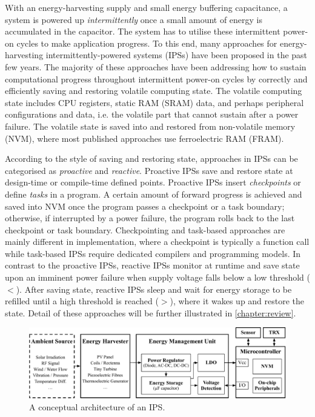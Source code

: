 
\needref
With an energy-harvesting supply and small energy buffering capacitance, a system is powered up \textit{intermittently} once a small amount of energy is accumulated in the capacitor. 
The system has to utilise these intermittent power-on cycles to make application progress. 
To this end, many approaches for energy-harvesting intermittently-powered systems (IPSs) have been proposed in the past few years. 
The majority of these approaches have been addressing how to sustain computational progress throughout intermittent power-on cycles by correctly and efficiently saving and restoring volatile computing state. 
The volatile computing state includes CPU registers, static RAM (SRAM) data, and perhaps peripheral configurations and data, i.e. the volatile part that cannot sustain after a power failure. 
The volatile state is saved into and restored from non-volatile memory (NVM), where most published approaches use ferroelectric RAM (FRAM). 

\needref
According to the style of saving and restoring state, approaches in IPSs can be categorised as \textit{proactive} and \textit{reactive}. 
Proactive IPSs save and restore state at design-time or compile-time defined points. 
Proactive IPSs insert \textit{checkpoints} or define \textit{tasks} in a program. 
A certain amount of forward progress is achieved and saved into NVM once the program passes a checkpoint or a task boundary; otherwise, if interrupted by a power failure, the program rolls back to the last checkpoint or task boundary. 
Checkpointing and task-based approaches are mainly different in implementation, where a checkpoint is typically a function call while task-based IPSs require dedicated compilers and programming models. 
In contrast to the proactive IPSs, reactive IPSs monitor  at runtime and save state upon an imminent power failure when supply voltage falls below a low threshold ($<$). 
After saving state, reactive IPSs sleep and wait for energy storage to be refilled until a high threshold is reached ($>$), where it wakes up and restore the state. 
Detail of these approaches will be further illustrated in \cref{chapter:review}.

\begin{figure}
  \centering
  \includegraphics[width=\columnwidth]{ch1_intro/figures/IPSarch}
  \caption{A conceptual architecture of an IPS.}
  \label{fig:ips_arch}
\end{figure}


